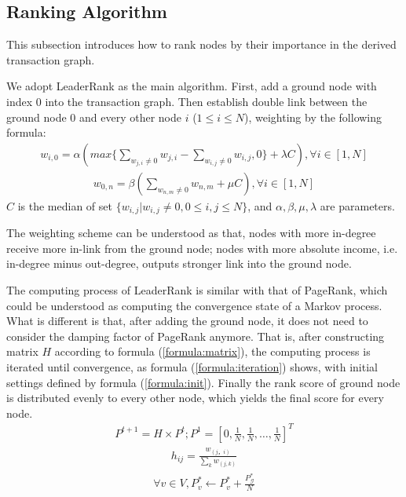 \subsection{Ranking Algorithm} \label{subsec:leaderrank}
This subsection introduces how to rank nodes by their importance in the derived transaction graph.

We adopt LeaderRank\cite{Chen2013}\cite{Li2014} as the main algorithm. First, add a ground node with index $0$ into the transaction graph. Then establish double link between the ground node $0$ and every other node $i$ ($1 \leq i \leq N$), weighting by the following formula:
\begin{align}\label{formula:weight1}
w_{i,0} = \alpha( max\{ \sum_{w_{j,i} \neq 0} w_{j,i} - \sum_{w_{i,j} \neq 0} w_{i,j} , 0\} + \lambda C ), \forall i \in [1,N]	
\end{align}
\begin{align}\label{formula:weight2} 
w_{0,n}	= \beta ( \sum_{w_{n,m} \neq 0} w_{n,m} + \mu C), \forall i \in [1,N]
\end{align}
$C$ is the median of set $\{w_{i,j} | w_{i,j} \neq 0, 0\leq i,j \leq N\}$, and $\alpha, \beta, \mu, \lambda$ are parameters. 

The weighting scheme can be understood as that, nodes with more in-degree receive more in-link from the ground node; nodes with more absolute income, i.e. in-degree minus out-degree, outputs stronger link into the ground node. 

The computing process of LeaderRank is similar with that of PageRank, which could be understood as computing the convergence state of a Markov process. What is different is that, after adding the ground node, it does not need to consider the damping factor of PageRank\cite{Brin2010}\cite{page1999pagerank} anymore. That is, after constructing matrix $H$ according to formula (\ref{formula:matrix}), the computing process is iterated until convergence, as formula (\ref{formula:iteration}) shows, with initial settings defined by formula (\ref{formula:init}). Finally the rank score of ground node is distributed evenly to every other node, which yields the final score for every node.
\begin{align} \label{formula:iteration}
	P^{t+1} = H \times P^{t}; P^1=[0, \frac{1}{N}, \frac{1}{N}, \dots, \frac{1}{N}]^T
\end{align}
\begin{align} \label{formula:matrix}
	h_{ij} = \frac{w_{(j，i)}}{\sum_k w_{(j,k)}}
\end{align}
\begin{align} \label{formula:init}
\forall v \in V, P^*_v \leftarrow P^*_v + \frac{P^*_{\mathcal{G}}}{N}
\end{align}

